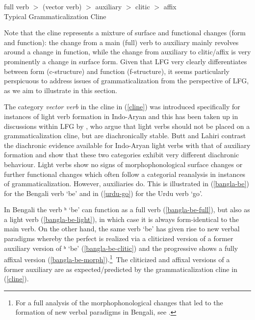 \documentclass[output=paper,hidelinks]{langscibook}
\begin{document}
\ea \label{cline}
full verb $>$ (vector verb) $>$ auxiliary $>$ clitic $>$
affix  \\ Typical Grammaticalization Cline \citep[108]{hopper_traugott_2003}
\z 

Note that the cline represents a mixture of surface and functional changes (form and function): the change from a main (full) verb to auxiliary mainly revolves around a change in function, while the change from auxiliary to clitic/affix is very prominently a change in surface form. Given that LFG very clearly differentiates between form (c-structure) and function (f-structure), it seems particularly perspicuous to address issues of grammaticalization from  the perspective of LFG, as we aim to illustrate in  this section. 

The category \textit{vector verb} in the cline in (\ref{cline}) was introduced specifically for instances of light verb formation in Indo-Aryan \citep{hook91} and this has been taken up in discussions within LFG by \citet{butt-lahiri2013}, who argue that light verbs should not be placed on a grammaticalization cline, but are diachronically stable.    
Butt and Lahiri contrast the diachronic evidence available for Indo-Aryan light verbs with that of auxiliary formation and show that these two categories exhibit very different diachronic behaviour. Light verbs show no signs of  morphophonological surface changes or further functional changes which often follow a categorial reanalysis in instances of grammaticalization. However, auxiliaries do.  This is illustrated in (\ref{bangla-be}) for the Bengali verb `be'  and  in (\ref{urdu-go}) for the Urdu verb `go'.  


In Bengali the verb {\textscripta}{\textteshlig}ʰ `be' can function as a full verb (\ref{bangla-be-full}), but also as a light verb (\ref{bangla-be-light}), in which case it is always form-identical to the main verb.  On the other hand, the same verb `be' has given rise to new verbal paradigms whereby the perfect is realized via a cliticized version of a former auxiliary version of {\textscripta}{\textteshlig}ʰ `be' (\ref{bangla-be-clitic}) and the progressive shows a fully affixal version  (\ref{bangla-be-morph}).\footnote{For a full analysis of the morphophonological changes that led to the formation of new verbal paradigms in Bengali, see \citet{lahiri00}.}\  The cliticized and affixal versions of a former auxiliary are as expected/predicted by the grammaticalization cline in (\ref{cline}).
\end{document}
